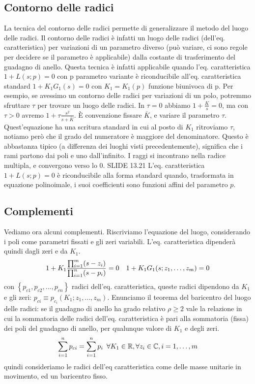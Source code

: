 \documentclass[11pt]{article}
\begin{document}
\subsection{Contorno delle radici}
La tecnica del contorno delle radici permette di generalizzare il metodo del luogo delle radici. Il contorno delle radici è infatti un luogo delle radici (dell'eq. caratteristica) per variazioni di un parametro diverso (può variare, ci sono regole per decidere se il parametro è applicabile) dalla costante di trasferimento del guadagno di anello. Questa tecnica è infatti applicabile quando l'eq. caratteristica $1+L(s;p)=0$ con p parametro variante è riconducibile all'eq. caratteristica standard $1+K_1G_1(s)=0$ con $K_1=K_1(p)$ funzione biunivoca di p. 
Per esempio, se avessimo un contorno delle radici per variazioni di un polo, potremmo sfruttare $\tau$ per trovare un luogo delle radici. In $\tau=0$ abbiamo $1+\frac{K}{s} =0 $, ma con $\tau>0$ avremo $1+\tau\frac{s^2}{s+\overline{K}}$. È convenzione fissare $\overline{K}$, e variare il parametro $\tau$. Quest'equazione ha una scritura standard in cui al posto di $K_1$ ritroviamo $\tau$, notiamo però che il grado del numeratore è maggiore del denominatore. Questo è abbastanza tipico (a differenza dei luoghi visti precedentemente), significa che i rami partono dai poli e uno dall'infinito. I raggi si incontrano nella radice multipla, e convergono verso lo 0. 
SLIDE 13.21
L'eq. caratteristica $1+L(s;p)=0$ è riconducibile alla forma standard quando, trasformata in equazione polinoimale, i suoi coefficienti sono funzioni affini del parametro $p$. 
\subsection{Complementi}
Vediamo ora alcuni complementi. Riscriviamo l'equazione del luogo, considerando i poli come parametri fissati e gli zeri variabili. L'eq. caratteristica dipenderà quindi dagli zeri e da $K_1$.
\begin{displaymath}
    1+K_1\frac{\prod_{i=1}^m (s-z_i)}{\prod_{i=1}^n (s-p_i)} = 0 \hspace{10px}1+K_1G_1(s;z_1,\dots,z_m) = 0
\end{displaymath}
con $\left\{p_{c1}, p_{c2},...,p_{cn}\right\}$ radici dell'eq. caratteristica, queste radici dipendono da $K_1$ e gli zeri: $p_{ci}\equiv p_{c_i}(K_1;z_1,...,z_m)$. Enunciamo il teorema del baricentro del luogo delle radici: se il guadagno di anello ha grado relativo $\rho\ge2$ vale la relazione in cui la sommatoria delle radici dell'eq. caratteristica è pari alla sommatoria (fissa) dei poli del guadagno di anello, per qualunque valore di $K_1$ e degli zeri.
\begin{displaymath}
    \sum_{i=1}^n p_{ci} = \sum_{i=1}^n p_i \hspace{5px}\forall K_1 \in \mathbb{R}, \forall z_i \in \mathbb{C}, i=1,\dots,m
\end{displaymath}
quindi consideriamo le radici dell'eq caratteristica come delle masse unitarie in movimento, ed un baricentro fisso.
\end{document}
